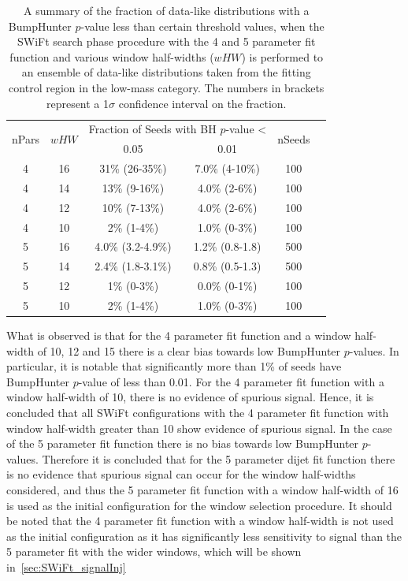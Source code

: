 \begin{table}[!ht]
\centering
\begin{tabular}{|c|c||c|c|c|c|}
  \hline
\multirow{2}{*}{nPars} & \multirow{2}{*}{$wHW$} &\multicolumn{2}{c|}{Fraction of Seeds with BH \mbox{$p$-value} \textless} &  \multirow{2}{*}{nSeeds} \\ \cline{3-4} 
                       &                     & 0.05                & 0.01            &        \\ 
  \hline
  4 &   16 &  31\%   (26-35\%)   &  7.0\% (4-10\%)  & 100  \\
  4 &   14 &  13\%   (9-16\%)    &  4.0\% (2-6\%)   & 100  \\
  4 &   12 &  10\%   (7-13\%)    &  4.0\% (2-6\%)   & 100  \\
  4 &   10 &  2\%   (1-4\%)      &  1.0\% (0-3\%)   & 100  \\
  \hline
  5 &   16 &  4.0\% (3.2-4.9\%)  &  1.2\% (0.8-1.8) & 500  \\
  5 &   14 &  2.4\% (1.8-3.1\%)  &  0.8\% (0.5-1.3) & 500  \\
  5 &   12 &  1\%   (0-3\%)      &  0.0\%  (0-1\%)  & 100  \\
  5 &   10 &  2\%   (1-4\%)      &  1.0\%  (0-3\%)  & 100  \\
  \hline
\end{tabular}
\vspace{10pt}
\caption{\label{tab:bumpH_lm_spuriousSignal_566}
  A summary of the fraction of data-like distributions 
  with a {\sc BumpHunter} \mbox{$p$-value} less than certain threshold values,
  when the SWiFt search phase procedure with the 4 and 5 parameter fit function
  and various window half-widths ($wHW$) is performed to an ensemble of data-like distributions
  taken from the fitting control region in the low-mass category.
  The numbers in brackets represent a 1$\sigma$ confidence interval on the fraction.}
\end{table}


What is observed is that for the 4 parameter fit function and a window half-width of 10, 12 and 15  there is a clear bias towards
low {\sc BumpHunter} \mbox{$p$-value}s.
In particular, it is notable that significantly more than 1\% of seeds have {\sc BumpHunter} \mbox{$p$-value} of less than 0.01.
For the 4 parameter fit function with a window half-width of 10, there is no evidence of spurious signal.
Hence, it is concluded that all SWiFt configurations with the 4 parameter fit function with window half-width greater than 10
show evidence of spurious signal.
In the case of the 5 parameter fit function there is no bias towards low {\sc BumpHunter} \mbox{$p$-value}s.
Therefore it is concluded that for the 5 parameter dijet fit function there is no evidence that spurious signal can occur for the window half-widths considered,
and thus the 5 parameter fit function with a window half-width of 16 is used as the initial configuration  for the window selection procedure.
It should be noted that the 4 parameter fit function with a window half-width is not used as the initial configuration as it has significantly
less sensitivity to signal than the 5 parameter fit with the wider windows, which will be shown in~\ref{sec:SWiFt_signalInj}


